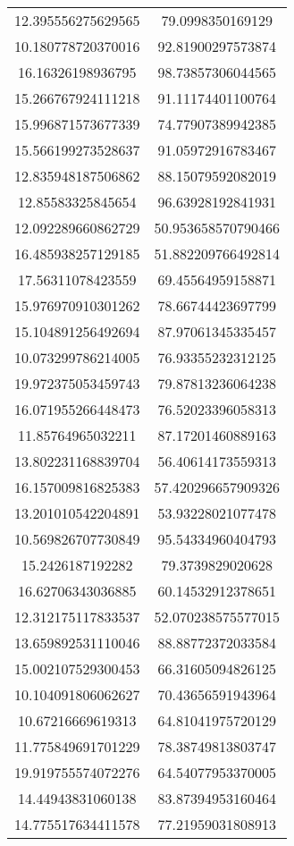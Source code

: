 \begin{table}
\begin{tabular}{cc}
12.395556275629565 & 79.0998350169129 \\
10.180778720370016 & 92.81900297573874 \\
16.16326198936795 & 98.73857306044565 \\
15.266767924111218 & 91.11174401100764 \\
15.996871573677339 & 74.77907389942385 \\
15.566199273528637 & 91.05972916783467 \\
12.835948187506862 & 88.15079592082019 \\
12.85583325845654 & 96.63928192841931 \\
12.092289660862729 & 50.953658570790466 \\
16.485938257129185 & 51.882209766492814 \\
17.56311078423559 & 69.45564959158871 \\
15.976970910301262 & 78.66744423697799 \\
15.104891256492694 & 87.97061345335457 \\
10.073299786214005 & 76.93355232312125 \\
19.972375053459743 & 79.87813236064238 \\
16.071955266448473 & 76.52023396058313 \\
11.85764965032211 & 87.17201460889163 \\
13.802231168839704 & 56.40614173559313 \\
16.157009816825383 & 57.420296657909326 \\
13.201010542204891 & 53.93228021077478 \\
10.569826707730849 & 95.54334960404793 \\
15.2426187192282 & 79.3739829020628 \\
16.62706343036885 & 60.14532912378651 \\
12.312175117833537 & 52.070238575577015 \\
13.659892531110046 & 88.88772372033584 \\
15.002107529300453 & 66.31605094826125 \\
10.104091806062627 & 70.43656591943964 \\
10.67216669619313 & 64.81041975720129 \\
11.775849691701229 & 78.38749813803747 \\
19.919755574072276 & 64.54077953370005 \\
14.44943831060138 & 83.87394953160464 \\
14.775517634411578 & 77.21959031808913 \\

\end{tabular}
\end{table}
